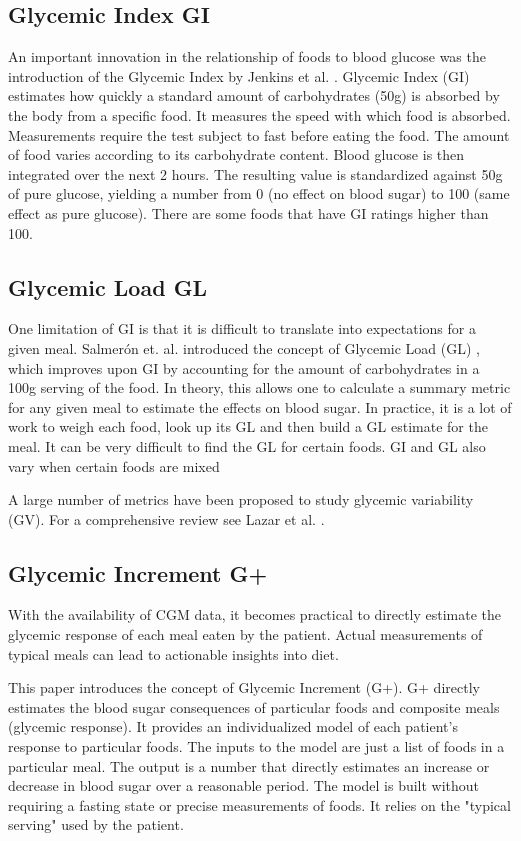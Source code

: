 \documentclass[conference]{IEEEtran}
\begin{document}
\subsection{Glycemic Index GI}

An important innovation in the relationship of foods to blood glucose was the introduction of the Glycemic Index by Jenkins et al. \cite{Jenkins_1981}. Glycemic Index (GI) estimates how quickly a standard amount of carbohydrates (50g) is absorbed by the body from a specific food. It measures the speed with which food is absorbed. Measurements require the test subject to fast before eating the food. The amount of food varies according to its carbohydrate content. Blood glucose is then integrated over the next 2 hours. The resulting value is standardized against 50g of pure glucose, yielding a number from 0 (no effect on blood sugar) to 100 (same effect as pure glucose). There are some foods that have GI ratings higher than 100.

\subsection{Glycemic Load GL}

One limitation of GI is that it is difficult to translate into expectations for a given meal. Salmerón et. al. introduced the concept of Glycemic Load (GL) \cite{Salmeron_1997}, which improves upon GI by accounting for the amount of carbohydrates in a 100g serving of the food. In theory, this allows one to calculate a summary metric for any given meal to estimate the effects on blood sugar. In practice, it is a lot of work to weigh each food, look up its GL and then build a GL estimate for the meal. It can be very difficult to find the GL for certain foods. GI and GL also vary when certain foods are mixed \cite{Murillo_2022}

A large number of metrics have been proposed to study glycemic variability (GV). For a comprehensive review see Lazar et al. \cite{Lazar_2023}.

\subsection{Glycemic Increment G+}

With the availability of CGM data, it becomes practical to directly estimate the glycemic response of each meal eaten by the patient. Actual measurements of typical meals can lead to actionable insights into diet.

This paper introduces the concept of Glycemic Increment (G+). G+ directly estimates the blood sugar consequences of particular foods and composite meals (glycemic response). It provides an individualized model of each patient's response to particular foods. The inputs to the model are just a list of foods in a particular meal. The output is a number that directly estimates an increase or decrease in blood sugar over a reasonable period. The model is built without requiring a fasting state or precise measurements of foods. It relies on the "typical serving" used by the patient.
\end{document}
